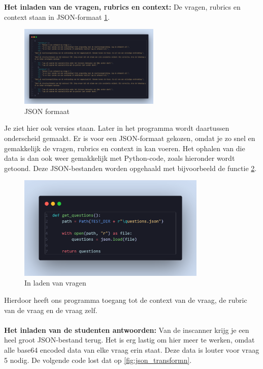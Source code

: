 \documentclass[12pt]{article}
\begin{document}
\noindent\textbf{Het inladen van de vragen, rubrics en context:}
\noindent De vragen, rubrics en context staan in JSON-formaat \ref{fig:json_formaat}. \\
\begin{figure}[H] %
    \centering
    \includegraphics[width=0.6\textwidth]{./images/methoden/nakijken/json_structuur.png}
    \caption{JSON formaat}
    \label{fig:json_formaat}
\end{figure}
Je ziet hier ook versies staan. Later in het programma wordt daartussen onderscheid gemaakt. Er is voor een JSON-formaat gekozen, omdat je zo snel en gemakkelijk de vragen, rubrics en context in kan voeren. Het ophalen van die data is dan ook weer gemakkelijk met Python-code, zoals hieronder wordt getoond. Deze JSON-bestanden worden opgehaald met bijvoorbeeld de functie \ref{fig:vragen_inladen}.\\
\begin{figure}[H] %
    \centering
    \includegraphics[width=0.8\textwidth]{./images/methoden/nakijken/load_questions.png}
    \caption{In laden van vragen}
    \label{fig:vragen_inladen}
\end{figure}
Hierdoor heeft ons programma toegang tot de context van de vraag, de rubric van de vraag en de vraag zelf. 
\\\\
\textbf{Het inladen van de studenten antwoorden:}
Van de inscanner krijg je een heel groot JSON-bestand terug. Het is erg lastig om hier meer te werken, omdat alle base64 encoded data van elke vraag erin staat. Deze data is louter voor vraag 5 nodig. De volgende code lost dat op \ref{fig:json_transformn}.
\end{document}
